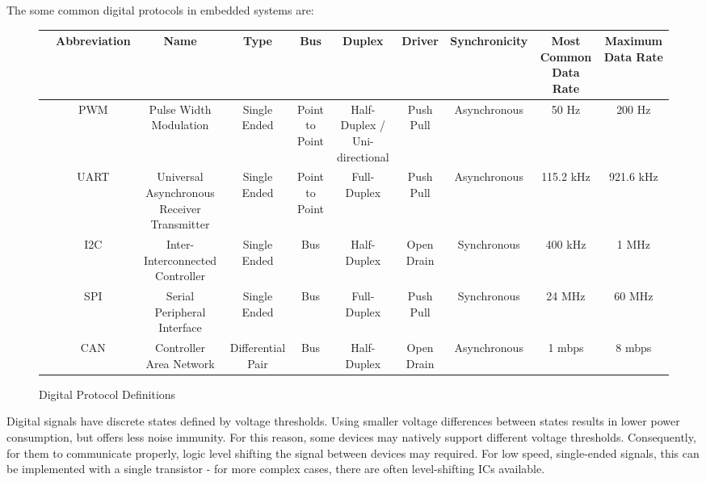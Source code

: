 \documentclass[main.tex]{subfiles}
\begin{document}
The some common digital protocols in embedded systems are:
\begin{figure}[h!]
    \centering
    \begin{tabular}{|c|c|c|c|c|c|c|c|c|c|}
        \hline 
        & Abbreviation & Name & Type & Bus & Duplex & Driver & Synchronicity & Most Common Data Rate & Maximum Data Rate \\ \hline
        & PWM & Pulse Width Modulation & Single Ended & Point to Point & Half-Duplex / Uni-directional & Push Pull & Asynchronous & 50 Hz & 200 Hz \\ \hline
        & UART & Universal Asynchronous Receiver Transmitter & Single Ended & Point to Point & Full-Duplex & Push Pull & Asynchronous & 115.2 kHz & 921.6 kHz \\ \hline
        & I2C & Inter-Interconnected Controller & Single Ended & Bus & Half-Duplex & Open Drain & Synchronous & 400 kHz & 1 MHz \\ \hline
        & SPI & Serial Peripheral Interface & Single Ended & Bus & Full-Duplex & Push Pull & Synchronous & 24 MHz & 60 MHz \\ \hline
        & CAN & Controller Area Network & Differential Pair & Bus & Half-Duplex & Open Drain & Asynchronous & 1 mbps & 8 mbps \\ \hline
    \end{tabular}
    \caption{Digital Protocol Definitions}
    \label{fig:digital_protocols}
\end{figure}

\noindent Digital signals have discrete states defined by voltage thresholds. Using smaller voltage differences between states results in lower power consumption, but offers less noise immunity. For this reason, some devices may natively support different voltage thresholds. Consequently, for them to communicate properly, logic level shifting the signal between devices may required. For low speed, single-ended signals, this can be implemented with a single transistor - for more complex cases, there are often level-shifting ICs available. 

\end{document}
